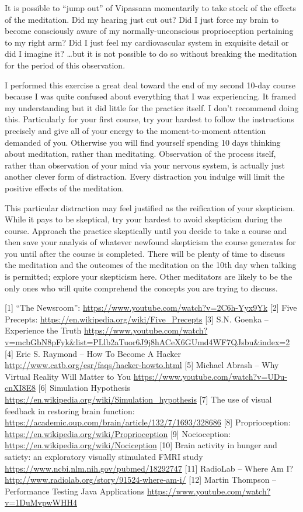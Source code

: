 \documentclass{article}
\begin{document}
It is possible to ``jump out'' of Vipassana momentarily to take stock of the effects of the meditation. Did my hearing just cut out? Did I just force my brain to become consciously aware of my normally-unconscious proprioception pertaining to my right arm? Did I just feel my cardiovascular system in exquisite detail or did I imagine it? …but it is not possible to do so without breaking the meditation for the period of this observation.

I performed this exercise a great deal toward the end of my second 10-day course because I was quite confused about everything that I was experiencing. It framed my understanding but it did little for the practice itself. I don't recommend doing this. Particularly for your first course, try your hardest to follow the instructions precisely and give all of your energy to the moment-to-moment attention demanded of you. Otherwise you will find yourself spending 10 days thinking about meditation, rather than meditating.
Observation of the process itself, rather than observation of your mind via your nervous system, is actually just another clever form of distraction. Every distraction you indulge will limit the positive effects of the meditation.

This particular distraction may feel justified as the reification of your skepticism. While it pays to be skeptical, try your hardest to avoid skepticism during the course. Approach the practice skeptically until you decide to take a course and then save your analysis of whatever newfound skepticism the course generates for you until after the course is completed. There will be plenty of time to discuss the meditation and the outcomes of the meditation on the 10th day when talking is permitted; explore your skepticism here. Other meditators are likely to be the only ones who will quite comprehend the concepts you are trying to discuss.

[1] ``The Newsroom'':
\url{https://www.youtube.com/watch?v=2C6h-Yyx9Yk}
[2] Five Precepts:
\url{https://en.wikipedia.org/wiki/Five_Precepts}
[3] S.N. Goenka -- Experience the Truth
\url{https://www.youtube.com/watch?v=mcbGbN8pFyk&list=PLlb2aTuor6J9j8hACeX6GUmd4WF7QJsbu&index=2}
[4] Eric S. Raymond -- How To Become A Hacker
\url{http://www.catb.org/esr/faqs/hacker-howto.html}
[5] Michael Abrash -- Why Virtual Reality Will Matter to You
\url{https://www.youtube.com/watch?v=UDu-cnXI8E8}
[6] Simulation Hypothesis
\url{https://en.wikipedia.org/wiki/Simulation_hypothesis}
[7] The use of visual feedback in restoring brain function:
\url{https://academic.oup.com/brain/article/132/7/1693/328686}
[8] Proprioception:
\url{https://en.wikipedia.org/wiki/Proprioception}
[9] Nocioception:
\url{https://en.wikipedia.org/wiki/Nociception}
[10] Brain activity in hunger and satiety: an exploratory visually stimulated FMRI study
\url{https://www.ncbi.nlm.nih.gov/pubmed/18292747}
[11] RadioLab -- Where Am I?
\url{http://www.radiolab.org/story/91524-where-am-i/}
[12] Martin Thompson -- Performance Testing Java Applications
\url{https://www.youtube.com/watch?v=1DuMvpwWHH4}
\end{document}
